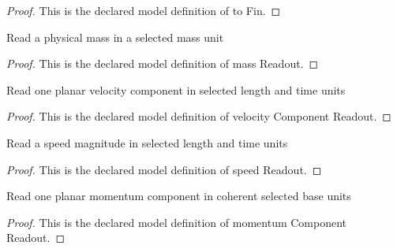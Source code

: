 \begin{proof}
  This is the declared model definition of to Fin.
\end{proof}
\begin{definition}
  \label{def:physics:phyx-mini-0641:phyxminiproblems-problemphyxmini0641-massreadout}
  Read a physical mass in a selected mass unit
\end{definition}
\begin{proof}
  This is the declared model definition of mass Readout.
\end{proof}
\begin{definition}
  \label{def:physics:phyx-mini-0641:phyxminiproblems-problemphyxmini0641-velocitycomponentreadout}
  Read one planar velocity component in selected length and time units
\end{definition}
\begin{proof}
  This is the declared model definition of velocity Component Readout.
\end{proof}
\begin{definition}
  \label{def:physics:phyx-mini-0641:phyxminiproblems-problemphyxmini0641-speedreadout}
  Read a speed magnitude in selected length and time units
\end{definition}
\begin{proof}
  This is the declared model definition of speed Readout.
\end{proof}
\begin{definition}
  \label{def:physics:phyx-mini-0641:phyxminiproblems-problemphyxmini0641-momentumcomponentreadout}
  Read one planar momentum component in coherent selected base units
\end{definition}
\begin{proof}
  This is the declared model definition of momentum Component Readout.
\end{proof}
